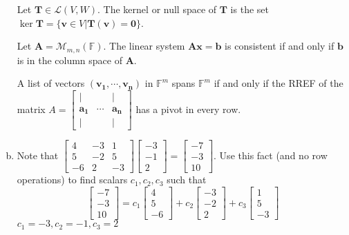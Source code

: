 \begin{enumerate}[(a)]
\begin{definition}
    \end{definition}
    \begin{definition}
    Let $\boldsymbol{T}\in\mathcal{L}(V,W)$. The kernel or null space of $\boldsymbol{T}$ is the set $\ker\boldsymbol{T}=\{\mathbf{v}\in V\vert \boldsymbol{T}(\mathbf{v})=\mathbf{0}\}$.
    \end{definition}
    \begin{corollary}
    Let $\mathbf{A} = \mathcal{M}_{m,n}(\mathbb{F})$. The linear system $\mathbf{Ax=b}$ is consistent if and only if $\mathbf{b}$ is in the column space of $\mathbf{A}$.
    \end{corollary}
    \begin{corollary}
    A list of vectors $(\mathbf{v_1,\cdots,v_n})$ in $\mathbb{F}^m$ spans $\mathbb{F}^m$ if and only if the RREF of the matrix $A = \begin{bmatrix} \vert & & \vert \\ \mathbf{a_1} & \cdots & \mathbf{a_n} \\ \vert & & \vert\end{bmatrix}$ has a pivot in every row.
    \end{corollary}
    
    \item
        Note that $\left[\begin{array}{rrr}4 & -3 & 1 \\ 5 & -2 & 5 \\ -6 & 2 & -3\end{array}\right]\left[\begin{array}{r}-3 \\ -1 \\ 2\end{array}\right]=\left[\begin{array}{c}-7 \\ -3 \\ 10\end{array}\right]$. Use this fact (and no row operations) to find scalars $c_{1}, c_{2}, c_{3}$ such that
        \[
        \left[\begin{array}{l}
        -7 \\
        -3 \\
        10
        \end{array}\right]=c_{1}\left[\begin{array}{r}
        4 \\
        5 \\
        -6
        \end{array}\right]+c_{2}\left[\begin{array}{r}
        -3 \\
        -2 \\
        2
        \end{array}\right]+c_{3}\left[\begin{array}{r}
        1 \\
        5 \\
        -3
        \end{array}\right]
        \]
        $c_{1}=-3, c_{2}=-1, c_{3}=2$
\end{enumerate}

